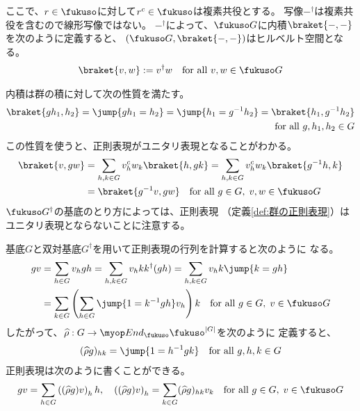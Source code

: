 	ここで、$r\in\fukuso$に対して$r^c\in\fukuso$は複素共役とする。
	写像$-^\dag$は複素共役を含むので線形写像ではない。
	$-^\dag$によって、$\fukuso G$に内積$\braket{-,-}$を次のように定義すると、
	$(\fukuso G,\braket{-,-})$はヒルベルト空間となる。
	\begin{equation*}\begin{split}
		\braket{v,w} := v^\dag w \quad\text{for all }v,w\in\fukuso G
	\end{split}\end{equation*}

	内積は群の積に対して次の性質を満たす。
	\begin{equation*}\begin{split}
		\braket{gh_1,h_2} = \jump{gh_1=h_2} = \jump{h_1=g^{-1}h_2} 
		= \braket{h_1,g^{-1}h_2} \\
		\quad\text{for all }g,h_1,h_2\in G
	\end{split}\end{equation*}
	この性質を使うと、正則表現がユニタリ表現となることがわかる。
	\begin{equation*}\begin{split}
		\braket{v, gw} &= \sum_{h,k\in G}v_h^cw_k\braket{h,gk}
		= \sum_{h,k\in G}v_h^cw_k\braket{g^{-1}h,k} \\
		& = \braket{g^{-1}v, gw} \quad\text{for all }g\in G,\;v,w\in\fukuso G
	\end{split}\end{equation*}
	$\fukuso G^\dag$の基底のとり方によっては、正則表現
	（定義\ref{def:群の正則表現}）はユニタリ表現とならないことに注意する。

	基底$G$と双対基底$G^\dag$を用いて正則表現の行列を計算すると次のように
	なる。
	\begin{equation*}\begin{split}
		gv &= \sum_{h\in G}v_hgh
		= \sum_{h,k\in G}v_hkk^\dag(gh)
		= \sum_{h,k\in G}v_hk\jump{k=gh} \\
		&= \sum_{k\in G}\left(\sum_{h\in G}\jump{1=k^{-1}gh}v_h\right)k
		\quad\text{for all }g\in G,\;v\in \fukuso G
	\end{split}\end{equation*}
	したがって、$\widehat{\rho}:G\to\End_\fukuso\fukuso^{|G|}$を次のように
	定義すると、
	\begin{equation}\label{eq:正則表現の成分}\begin{split}
		(\widehat{\rho}g)_{hk} = \jump{1=h^{-1}gk}
		\quad\text{for all }g,h,k\in G
	\end{split}\end{equation}
	正則表現は次のように書くことができる。
	\begin{equation*}\begin{split}
		gv = \sum_{h\in G}\left((\widehat{\rho}g)v\right)_hh
		,\quad \left((\widehat{\rho}g)v\right)_h 
		= \sum_{k\in G} (\widehat{\rho}g)_{hk}v_k
		\quad\text{for all }g\in G,\;v\in \fukuso G
	\end{split}\end{equation*}


